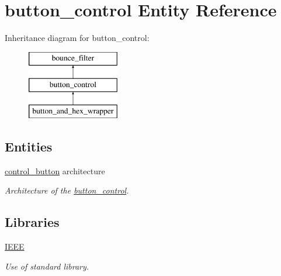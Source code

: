 \hypertarget{classbutton__control}{\section{button\-\_\-control Entity Reference}
\label{classbutton__control}
}
Inheritance diagram for button\-\_\-control\-:\begin{figure}[H]
\begin{center}
\leavevmode
\includegraphics[height=3.000000cm]{classbutton__control}
\end{center}
\end{figure}
\subsection*{Entities}
\begin{DoxyCompactItemize}
\item 
\hyperlink{classbutton__control_1_1control__button}{control\-\_\-button} architecture
\begin{DoxyCompactList}\small\item\em Architecture of the \hyperlink{classbutton__control}{button\-\_\-control}. \end{DoxyCompactList}\end{DoxyCompactItemize}
\subsection*{Libraries}
 \begin{DoxyCompactItemize}
\item 
\hypertarget{classbutton__control_ae4f03c286607f3181e16b9aa12d0c6d4}{\hyperlink{classbutton__control_ae4f03c286607f3181e16b9aa12d0c6d4}{I\-E\-E\-E} }\label{classbutton__control_ae4f03c286607f3181e16b9aa12d0c6d4}

\begin{DoxyCompactList}\small\item\em Use of standard library. \end{DoxyCompactList}\end{DoxyCompactItemize}
